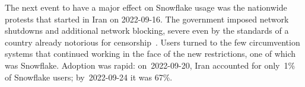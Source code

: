 \documentclass[letterpaper,twocolumn]{article}
\begin{document}
The next event to have a major effect on Snowflake usage
was the nationwide protests that started in Iran on \mbox{2022-09-16}.
The government imposed network shutdowns
and additional network blocking,
severe even by the standards of a country already notorious
for censorship~\cite{ooni-2022-iran-blocks-social-media-mahsa-amini-protests}.
Users turned to the few circumvention systems
that continued working in the face of the new restrictions,
one of which was Snowflake.
Adoption was rapid:
on~\mbox{2022-09-20}, Iran accounted for only~1\% of Snowflake users;
by~\mbox{2022-09-24} it was 67\%.
\end{document}
